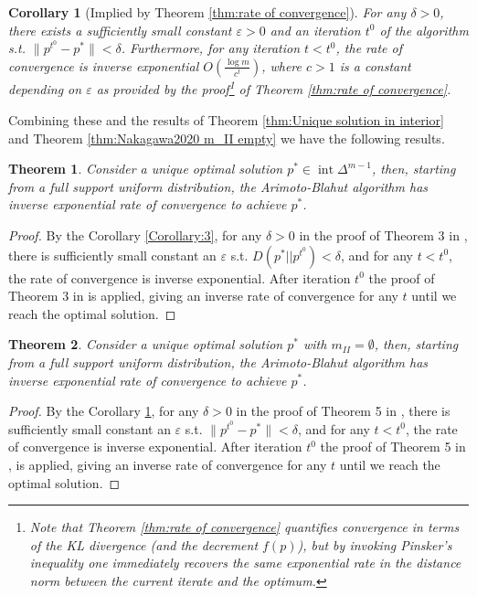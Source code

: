 \documentclass[11pt, letterpaper]{article}
\newtheorem{theorem}{Theorem}
\newtheorem{corollary}{Corollary}
\DeclareMathOperator{\interior}{int}
\begin{document}
\begin{corollary}[Implied by Theorem \ref{thm:rate of convergence}]
\label{Corollary:4}
For any $\delta > 0$, there exists a sufficiently small constant $\varepsilon > 0$ and an iteration $t^0$ of the algorithm s.t. $\|p^{t^0} -p^*\| < \delta$. Furthermore, for any iteration $t < t^0$, the rate of convergence is inverse exponential $O\left(\frac{\log m}{c^t}\right)$, where $c>1$ is a constant depending on $\varepsilon$ as provided by the proof\footnote{Note that Theorem \ref{thm:rate of convergence} quantifies convergence in terms of the KL divergence (and the decrement $f(p)$), but  by invoking Pinsker’s inequality one immediately recovers the same exponential rate in the distance norm between the current iterate and the optimum.} of Theorem \ref{thm:rate of convergence}.\\
\end{corollary}

\noindent Combining these and the results of Theorem \ref{thm:Unique solution in interior} and Theorem \ref{thm:Nakagawa2020 m_II empty} we have the following results.

\begin{theorem}\label{thm:new Nakagawa}
Consider a unique optimal solution $p^* \in \interior \Delta^{m - 1}$, then, starting from a full support uniform distribution, the Arimoto-Blahut algorithm has inverse exponential rate of convergence to achieve $p^*$.
\end{theorem}

\begin{proof}
By the Corollary \ref{Corollary:3}, for any $\delta>0$ in the proof of Theorem 3 in \cite{Arimoto1972AnAF}, there is sufficiently small constant an $\varepsilon$ s.t. $D\left(p^* || p^{t^0}\right)< \delta$, and for any $t < t^0$, the rate of convergence is inverse exponential. After iteration $t^0$ the proof of Theorem 3 in \cite{Arimoto1972AnAF} is applied, giving an inverse rate of convergence for any $t$ until we reach the optimal solution.

\end{proof}


\begin{theorem}\label{thm:new AB}
Consider a unique optimal solution $p^*$ with $m_{II} = \emptyset$, then, starting from a full support uniform distribution, the Arimoto-Blahut algorithm has inverse exponential rate of convergence to achieve $p^*$.
\end{theorem}

\begin{proof}
By the Corollary \ref{Corollary:4}, for any $\delta > 0$ in the proof of Theorem 5 in \cite{Nakagawa2020AnalysisOT}, there is sufficiently small constant an $\varepsilon$ s.t. $\| p^{t^0}-p^*\|< \delta$, and for any $t < t^0$, the rate of convergence is inverse exponential. After iteration $t^0$ the proof of Theorem 5 in \cite{Nakagawa2020AnalysisOT}, is applied, giving an inverse rate of convergence for any $t$ until we reach the optimal solution.
\end{proof}
\end{document}
